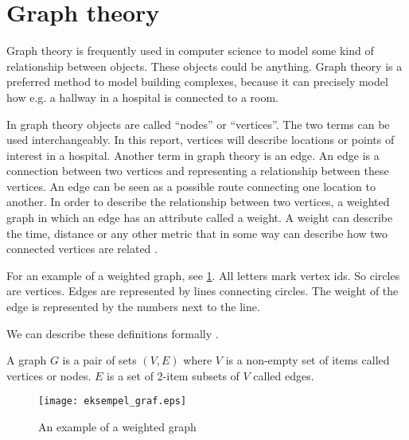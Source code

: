 \section{Graph theory}

Graph theory is frequently used in computer science to model some kind of relationship between objects. These objects could be anything. Graph theory is a preferred method to model building complexes, because it can precisely model how e.g. a hallway in a hospital is connected to a room.

In graph theory objects are called \enquote{nodes} or \enquote{vertices}. The two terms can be used interchangeably. In this report, vertices will describe locations or points of interest in a hospital. Another term in graph theory is an edge. An edge is a connection between two vertices and representing a relationship between these vertices. An edge can be seen as a possible route connecting one location to another. In order to describe the relationship between two vertices, a weighted graph in which an edge has an attribute called a weight. A weight can describe the time, distance or any other metric that in some way can describe how two connected vertices are related \cite{wiki_graph_glos,MIT2012}.

For an example of a weighted graph, see \cref{fig:graph}. All letters mark vertex ids. So circles are vertices. Edges are represented by lines connecting circles. The weight of the edge is represented by the numbers next to the line.

We can describe these definitions formally \cite{MIT2012}.
\begin{mydef}
	A graph $G$ is a pair of sets $(V,E)$ where $V$ is a non-empty set of items called vertices or nodes. $E$ is a set of 2-item subsets of $V$ called edges.
\end{mydef}

  \begin{figure}[ht!]
    \centering
    \texttt{[image: eksempel\_graf.eps]}
    \caption{An example of a weighted graph}
    \label{fig:graph}
  \end{figure}



